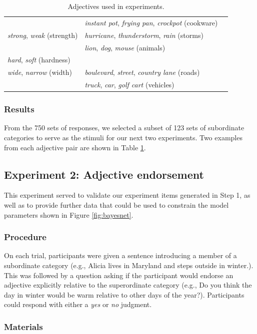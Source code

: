 \documentclass[doc]{apa6}
\begin{document}
\begin{table}[ht]
\begin{tabularx}{\textwidth}{lll}
  &  \emph{instant pot}, \emph{frying pan}, \emph{crockpot} (cookware) \\
  \emph{strong}, \emph{weak} (strength) &  \emph{hurricane}, \emph{thunderstorm}, \emph{rain} (storms)\\
  &  \emph{lion}, \emph{dog}, \emph{mouse} (animals)\\
  \emph{hard}, \emph{soft} (hardness) &  \\
  \emph{wide}, \emph{narrow} (width) & \emph{boulevard}, \emph{street}, \emph{country lane} (roads) \\
  & \emph{truck}, \emph{car}, \emph{golf cart} (vehicles) \\
   \hline
\end{tabularx}
\caption{Adjectives used in experiments.} 
\label{tab:1}
\endgroup
\end{table}

\subsubsection{Results}
From the 750 sets of responses, we selected a subset of 123 sets of subordinate categories to serve as the stimuli for our next two experiments. Two examples from each adjective pair are shown in Table \ref{tab:1}. 


\subsection{Experiment 2: Adjective endorsement}

This experiment served to validate our experiment items generated in Step 1, as well as to provide further data that could be used to constrain the model parameters shown in Figure \ref{fig:bayesnet}.

\subsubsection{Procedure}

On each trial, participants were given a sentence introducing a member of a subordinate category (e.g., Alicia lives in Maryland and steps outside in winter.). 
This was followed by a question asking if the participant would endorse an adjective explicitly relative to the superordinate category (e.g., Do you think the day in winter would be warm relative to other days of the year?).
Participants could respond with either a \emph{yes} or \emph{no} judgment.

\subsubsection{Materials}
\end{document}
